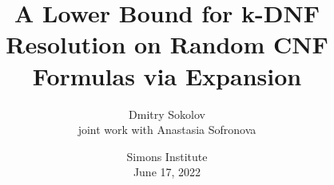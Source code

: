 

\titlegraphic{
    
}


\title[]{
    A Lower Bound for k-DNF Resolution on Random CNF Formulas via Expansion
}

\author{
    Dmitry Sokolov \\
    joint work with Anastasia Sofronova
}  


\date{Simons Institute\\ June 17, 2022}






    \maketitle

    
    
    

